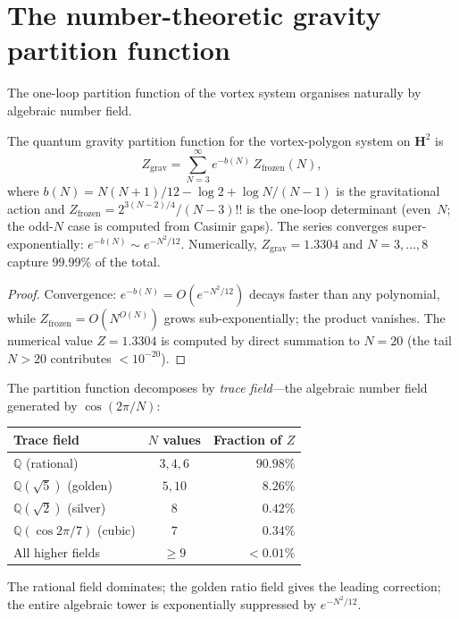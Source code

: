 
\section{The number-theoretic gravity partition function}
\label{sec:gravity-partition}

The one-loop partition function of the vortex system organises
naturally by algebraic number field.

\begin{proposition}
\label{prop:gravity-partition}
The quantum gravity partition function for the vortex-polygon system
on $\mathbf{H}^2$ is
\begin{equation}\label{eq:Z-gravity}
  Z_{\mathrm{grav}} = \sum_{N=3}^{\infty}
  e^{-b(N)}\,Z_{\mathrm{frozen}}(N),
\end{equation}
where $b(N) = N(N{+}1)/12 - \log 2 + \log N/(N{-}1)$ is the
gravitational action and $Z_{\mathrm{frozen}} = 2^{3(N-2)/4}/(N{-}3)!!$
is the one-loop determinant (even~$N$; the odd-$N$ case is computed
from Casimir gaps).
The series converges super-exponentially: $e^{-b(N)} \sim e^{-N^2/12}$.
Numerically, $Z_{\mathrm{grav}} = 1.3304$ and
$N = 3,\ldots,8$ capture $99.99\%$ of the total.
\end{proposition}

\begin{proof}
Convergence: $e^{-b(N)} = O(e^{-N^2/12})$ decays faster than any
polynomial, while $Z_{\mathrm{frozen}} = O(N^{O(N)})$ grows
sub-exponentially; the product vanishes.
The numerical value $Z = 1.3304$ is computed by direct summation
to $N = 20$ (the tail $N > 20$ contributes $< 10^{-20}$).
\end{proof}

The partition function decomposes by \emph{trace field}---the
algebraic number field generated by $\cos(2\pi/N)$:
\begin{center}
\small
\begin{tabular}{lcr}
\toprule
Trace field & $N$ values & Fraction of $Z$ \\
\midrule
$\mathbb{Q}$ (rational) & $3, 4, 6$ & $90.98\%$ \\
$\mathbb{Q}(\sqrt{5})$ (golden) & $5, 10$ & $8.26\%$ \\
$\mathbb{Q}(\sqrt{2})$ (silver) & $8$ & $0.42\%$ \\
$\mathbb{Q}(\cos 2\pi/7)$ (cubic) & $7$ & $0.34\%$ \\
All higher fields & $\ge 9$ & $< 0.01\%$ \\
\bottomrule
\end{tabular}
\end{center}
\noindent
The rational field dominates; the golden ratio field gives the
leading correction; the entire algebraic tower is exponentially
suppressed by $e^{-N^2/12}$.

